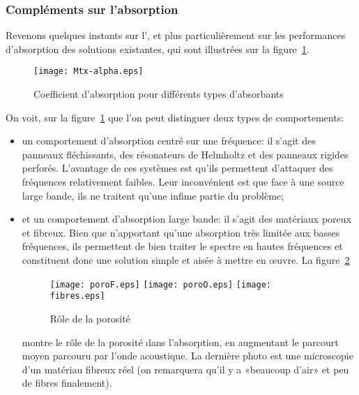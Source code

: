 \medskip
\subsubsection{Compléments sur l'absorption}

Revenons quelques instants sur l', et plus particulièrement sur les performances d'absorption des solutions existantes, qui sont illustrées sur la figure~\ref{Fig-mtxalpha}.
\begin{figure}[h!]
\centering
\texttt{[image: Mtx-alpha.eps]}
\caption{Coefficient d'absorption pour différents types d'absorbants}\label{Fig-mtxalpha}
\end{figure}

On voit, sur la figure~\ref{Fig-mtxalpha} que l'on peut distinguer deux types de comportements:
\begin{itemize}
   \item un comportement d'absorption centré sur une fréquence: il s'agit des panneaux fléchissants, des résonateurs de Helmholtz et des panneaux rigides perforés. L'avantage de ces systèmes est qu'ils permettent d'attaquer des fréquences relativement faibles. Leur inconvénient est que face à une source large bande, ils ne traitent qu'une infime partie du problème;
  
   \item et un comportement d'absorption large bande: il s'agit des matériaux poreux et fibreux. Bien que n'apportant qu'une absorption très limitée aux basses fréquences, ils permettent de bien traiter le spectre en hautes fréquences et constituent donc une solution simple et aisée à mettre en œuvre. La figure~\ref{Fig-poro}
\begin{figure}[h!]
\centering
\texttt{[image: poroF.eps]}\hspace{4mm}
\texttt{[image: poroO.eps]}\hspace{4mm}
\texttt{[image: fibres.eps]}
\caption{Rôle de la porosité}\label{Fig-poro}
\end{figure}
montre le rôle de la porosité dans l'absorption, en augmentant le parcourt moyen parcouru par l'onde acoustique. La dernière photo est une microscopie d'un matériau fibreux réel (on remarquera qu'il y a «beaucoup d'air» et peu de fibres finalement).
\end{itemize}


